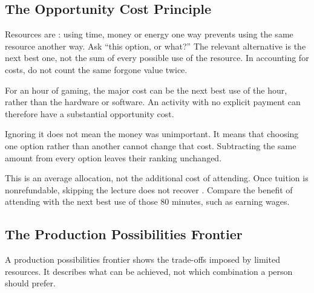 \subsection{The Opportunity Cost Principle}
Resources are : using time, money or energy one way prevents
using the same resource another way. Ask ``this option, or what?'' The
relevant alternative is the next best one, not the sum of every possible
use of the resource. In accounting for costs, do not count the same forgone
value twice.

For an hour of gaming, the major cost can be the next best use of the hour,
rather than the hardware or software. An activity with no explicit payment
can therefore have a substantial opportunity cost.

Ignoring it does not mean the money was unimportant. It means that choosing
one option rather than another cannot change that cost. Subtracting the
same amount from every option leaves their ranking unchanged.

This is an average allocation, not the additional cost of attending.
Once tuition is nonrefundable, skipping the lecture does not recover
. Compare the benefit of attending with the next best use
of those 80 minutes, such as earning wages.

\subsection{The Production Possibilities Frontier}
A production possibilities frontier shows the trade-offs imposed by
limited resources. It describes what can be achieved, not which
combination a person should prefer.

